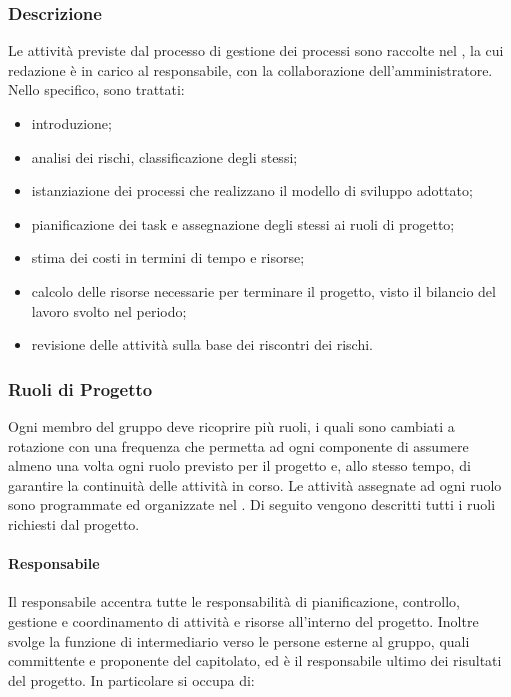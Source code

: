 	\subsubsection{Descrizione}
	
		Le attività previste dal processo di gestione dei processi sono raccolte nel , la cui redazione è in carico al responsabile, con la collaborazione dell'amministratore.
		\newline
		Nello specifico, sono trattati:
		
		\begin{itemize}
			\item introduzione;
			\item analisi dei rischi, classificazione degli stessi;
			\item istanziazione dei processi che realizzano il modello di sviluppo adottato;
			\item pianificazione dei task e assegnazione degli stessi ai ruoli di progetto;
			\item stima dei costi in termini di tempo e risorse;
			\item calcolo delle risorse necessarie per terminare il progetto, visto il bilancio del lavoro svolto nel periodo;
			\item revisione delle attività sulla base dei riscontri dei rischi.
		\end{itemize}
	
	\subsubsection{Ruoli di Progetto}
	
		Ogni membro del gruppo deve ricoprire più ruoli, i quali sono cambiati a rotazione con una frequenza che permetta ad ogni componente di assumere almeno una volta ogni ruolo previsto per il progetto e, allo stesso tempo, di garantire la continuità delle attività in corso.
		\newline
		Le attività assegnate ad ogni ruolo sono programmate ed organizzate nel .
		\newline
		Di seguito vengono descritti tutti i ruoli richiesti dal progetto.
	
		\paragraph{Responsabile}
		
			Il responsabile accentra tutte le responsabilità di pianificazione, controllo, gestione e coordinamento di attività e risorse all'interno del progetto. Inoltre svolge la funzione di intermediario verso le persone esterne al gruppo, quali committente e proponente del capitolato, ed è il responsabile ultimo dei risultati del progetto.
			\newline
			In particolare si occupa di:
			
